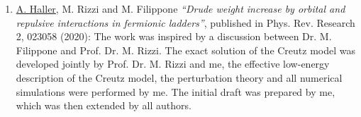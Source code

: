 \documentclass{svmono}
\providecommand{\DIFdelbegin}{} %
\newcommand{\DIFscaledelfig}{0.5}
\newlength{\DIFdelgraphicswidth} %
\newlength{\DIFdelgraphicsheight} %
\newcommand{\DIFdelincludegraphics}[2][]{%
\sbox{\DIFdelgraphicsbox}{\DIFOincludegraphics[#1]{#2}}%
\settoboxwidth{\DIFdelgraphicswidth}{\DIFdelgraphicsbox} %
\settoboxtotalheight{\DIFdelgraphicsheight}{\DIFdelgraphicsbox} %
\scalebox{\DIFscaledelfig}{%
\parbox[b]{\DIFdelgraphicswidth}{\usebox{\DIFdelgraphicsbox}\\[-\baselineskip] \rule{\DIFdelgraphicswidth}{0em}}\llap{\resizebox{\DIFdelgraphicswidth}{\DIFdelgraphicsheight}{%
\setlength{\unitlength}{\DIFdelgraphicswidth}%
\begin{picture}(1,1)%
\thicklines\linethickness{2pt} %
{\color[rgb]{1,0,0}\put(0,0){\framebox(1,1){}}}%
{\color[rgb]{1,0,0}\put(0,0){\line( 1,1){1}}}%
{\color[rgb]{1,0,0}\put(0,1){\line(1,-1){1}}}%
\end{picture}%
}\hspace*{3pt}}} %
} %
\DeclareRobustCommand{\DIFdelbegin}{\DIFOdelbegin \let\includegraphics\DIFdelincludegraphics} %
\begin{document}
\begin{enumerate}
    \item{\underline{A. Haller}, M. Rizzi and M. Filippone {\it ``Drude weight increase by orbital and repulsive interactions in fermionic ladders''}, published in Phys. Rev. Research 2, 023058 (2020):
    The work was inspired by a discussion between Dr. M. Filippone and Prof. Dr. M. Rizzi. The exact solution of the Creutz model was developed jointly by Prof. Dr. M. Rizzi and me, the effective low-energy description of the Creutz model, the perturbation theory and all numerical simulations were performed by me. The initial draft was prepared by me, which was then extended by all authors.}
    \DIFdelbegin %

\end{enumerate}
\end{document}
